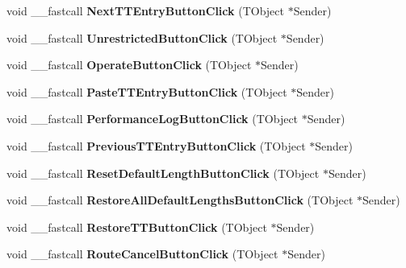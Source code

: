 \begin{DoxyCompactItemize}
void \+\_\+\+\_\+fastcall {\bfseries Next\+T\+T\+Entry\+Button\+Click} (T\+Object $\ast$Sender)
\item 
\mbox{\label{class_t_interface_a12829827d073ae5056d81711947215d7}} 
void \+\_\+\+\_\+fastcall {\bfseries Unrestricted\+Button\+Click} (T\+Object $\ast$Sender)
\item 
\mbox{\label{class_t_interface_a26619c94a8ad27b574e0963dd123dc2a}} 
void \+\_\+\+\_\+fastcall {\bfseries Operate\+Button\+Click} (T\+Object $\ast$Sender)
\item 
\mbox{\label{class_t_interface_a02c5eb27baa019cb04e4704470371ae9}} 
void \+\_\+\+\_\+fastcall {\bfseries Paste\+T\+T\+Entry\+Button\+Click} (T\+Object $\ast$Sender)
\item 
\mbox{\label{class_t_interface_afd6edff7367e3c8d878d47f24b30e498}} 
void \+\_\+\+\_\+fastcall {\bfseries Performance\+Log\+Button\+Click} (T\+Object $\ast$Sender)
\item 
\mbox{\label{class_t_interface_ac5cc89b457ec23bfceaf09f784b2daa2}} 
void \+\_\+\+\_\+fastcall {\bfseries Previous\+T\+T\+Entry\+Button\+Click} (T\+Object $\ast$Sender)
\item 
\mbox{\label{class_t_interface_aa439e164f7f2304477010985c2caabed}} 
void \+\_\+\+\_\+fastcall {\bfseries Reset\+Default\+Length\+Button\+Click} (T\+Object $\ast$Sender)
\item 
\mbox{\label{class_t_interface_a9113d88b504cd30eb8dd6ecddde1c0ec}} 
void \+\_\+\+\_\+fastcall {\bfseries Restore\+All\+Default\+Lengths\+Button\+Click} (T\+Object $\ast$Sender)
\item 
\mbox{\label{class_t_interface_ae3e591300b5557eb124bad845ea6c34e}} 
void \+\_\+\+\_\+fastcall {\bfseries Restore\+T\+T\+Button\+Click} (T\+Object $\ast$Sender)
\item 
\mbox{\label{class_t_interface_a6296d0831188d08a736eea44d418c381}} 
void \+\_\+\+\_\+fastcall {\bfseries Route\+Cancel\+Button\+Click} (T\+Object $\ast$Sender)
\item 

\end{DoxyCompactItemize}

